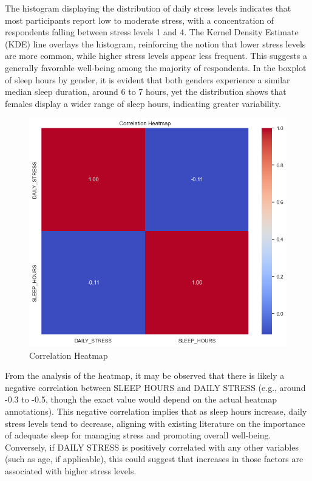 \documentclass[runningheads]{llncs}
\begin{document}
\begin{enumerate}
The histogram displaying the distribution of daily stress levels indicates that most participants report low to moderate stress, with a concentration of respondents falling between stress levels 1 and 4. The Kernel Density Estimate (KDE) line overlays the histogram, reinforcing the notion that lower stress levels are more common, while higher stress levels appear less frequent. This suggests a generally favorable well-being among the majority of respondents. In the boxplot of sleep hours by gender, it is evident that both genders experience a similar median sleep duration, around 6 to 7 hours, yet the distribution shows that females display a wider range of sleep hours, indicating greater variability. 

\newpage
\begin{figure}
    \centering
    \includegraphics[width=1.0\linewidth]{eda6.png}
    \caption{Correlation Heatmap} 
    \label{fig:enter-label}
\end{figure}

From the analysis of the heatmap, it may be observed that there is likely a negative correlation between SLEEP HOURS and DAILY STRESS (e.g., around -0.3 to -0.5, though the exact value would depend on the actual heatmap annotations). This negative correlation implies that as sleep hours increase, daily stress levels tend to decrease, aligning with existing literature on the importance of adequate sleep for managing stress and promoting overall well-being. Conversely, if DAILY STRESS is positively correlated with any other variables (such as age, if applicable), this could suggest that increases in those factors are associated with higher stress levels.


\end{enumerate}
\end{document}
